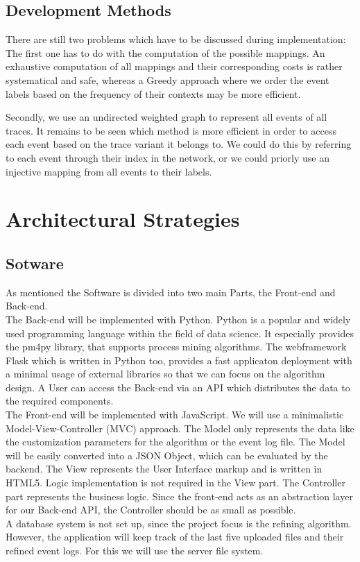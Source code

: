 \documentclass[notitlepage]{article}
\begin{document}
\begin{flushleft}
\subsection{Development Methods}
There are still two problems which have to be discussed during implementation:\\
\medskip
The first one has to do with the computation of the possible mappings.
An exhaustive computation of all mappings and their corresponding costs is rather systematical and safe, whereas a Greedy approach where we order the event labels based on the frequency of their contexts may be more efficient.

Secondly, we use an undirected weighted graph to represent all events of all traces. It remains to be seen which method is more efficient in order to access each event based on the trace variant it belongs to.
We could do this by referring to each event through their index in the network, or we could priorly use an injective mapping from all events to their labels. 


\section{Architectural Strategies}

\subsection{Sotware}
As mentioned the Software is divided into two main Parts, the Front-end and Back-end.\\ 
\medskip
The Back-end will be implemented with Python.
Python is a popular and widely used programming language within the field of data science. It especially provides the pm4py library, that supports process mining algorithms.
The webframework Flask which is written in Python too, provides a fast applicaton deployment with a minimal usage of external libraries so that we can focus on the algorithm design. A User can access the Back-end via an API which distributes the data to the required components.\\
\medskip
The Front-end will be implemented with JavaScript. We will use a minimalistic Model-View-Controller (MVC) approach. The Model only represents the data like the customization parameters for the algorithm or the event log file. The Model will be easily converted into a JSON Object, which can be evaluated by the backend.
The View represents the User Interface markup and is written in HTML5. Logic implementation is not required in the View part. The Controller part represents 
the business logic. Since the front-end acts as an abstraction layer for our Back-end API, the Controller should be as small as possible.\\
\medskip
A database system is not set up, since the project focus is the refining algorithm. However, the application will keep track of the last five uploaded files and their refined event logs. For this we will use the server file system. 


\end{flushleft}
\end{document}
